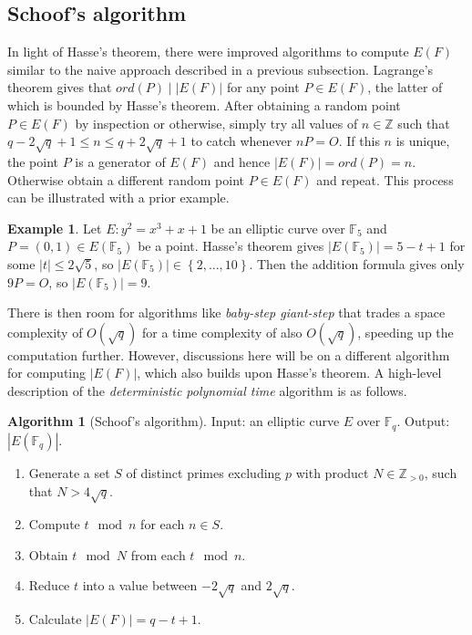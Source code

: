 \documentclass{article}
\newcommand{\F}{\mathbb{F}}
\newcommand{\Z}{\mathbb{Z}}
\newcommand{\rb}[1]{\left( #1 \right)}
\newcommand{\cb}[1]{\left\{ #1 \right\}}
\newcommand{\abs}[1]{\left\lvert #1 \right\rvert}
\theoremstyle{definition}\newtheorem*{definition}{Definition}
\theoremstyle{definition}\newtheorem*{example}{Example}
\theoremstyle{definition}\newtheorem*{remark}{Remark}
\newtheorem{algorithm}[proposition]{Algorithm}
\begin{document}
\pagebreak

\subsection{Schoof's algorithm}

In light of Hasse's theorem, there were improved algorithms to compute $ E\rb{F} $ similar to the naive approach described in a previous subsection. Lagrange's theorem gives that $ ord\rb{P} \mid \abs{E\rb{F}} $ for any point $ P \in E\rb{F} $, the latter of which is bounded by Hasse's theorem. After obtaining a random point $ P \in E\rb{F} $ by inspection or otherwise, simply try all values of $ n \in \Z $ such that $ q - 2\sqrt{q} + 1 \le n \le q + 2\sqrt{q} + 1 $ to catch whenever $ nP = O $. If this $ n $ is unique, the point $ P $ is a generator of $ E\rb{F} $ and hence $ \abs{E\rb{F}} = ord\rb{P} = n $. Otherwise obtain a different random point $ P \in E\rb{F} $ and repeat. This process can be illustrated with a prior example.

\begin{example}
Let $ E : y^2 = x^3 + x + 1 $ be an elliptic curve over $ \F_5 $ and $ P = \rb{0, 1} \in E\rb{\F_5} $ be a point. Hasse's theorem gives $ \abs{E\rb{\F_5}} = 5 - t + 1 $ for some $ \abs{t} \le 2\sqrt{5} $, so $ \abs{E\rb{\F_5}} \in \cb{2, \dots, 10} $. Then the addition formula gives only $ 9P = O $, so $ \abs{E\rb{\F_5}} = 9 $.
\end{example}

There is then room for algorithms like \emph{baby-step giant-step} that trades a space complexity of $ O\rb{\sqrt{q}} $ for a time complexity of also $ O\rb{\sqrt{q}} $, speeding up the computation further. However, discussions here will be on a different algorithm for computing $ \abs{E\rb{F}} $, which also builds upon Hasse's theorem. A high-level description of the \emph{deterministic polynomial time} algorithm is as follows.

\begin{algorithm}[Schoof's algorithm]
Input: an elliptic curve $ E $ over $ \F_q $. Output: $ \abs{E\rb{\F_q}} $.
\begin{enumerate}
\item Generate a set $ S $ of distinct primes excluding $ p $ with product $ N \in \Z_{> 0} $, such that $ N > 4\sqrt{q} $.
\item Compute $ t \mod n $ for each $ n \in S $.
\item Obtain $ t \mod N $ from each $ t \mod n $.
\item Reduce $ t $ into a value between $ -2\sqrt{q} $ and $ 2\sqrt{q} $.
\item Calculate $ \abs{E\rb{F}} = q - t + 1 $.
\end{enumerate}
\end{algorithm}
\end{document}
